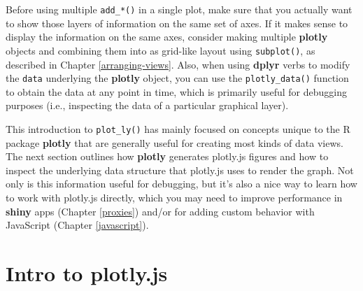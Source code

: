 \documentclass[
  12pt,
]{krantz}
\makeatletter
\newenvironment{Shaded}{\begin{snugshade}}{\end{snugshade}}
\newcommand{\CommentTok}[1]{\textcolor[rgb]{0.56,0.35,0.01}{\textit{#1}}}
\newcommand{\DataTypeTok}[1]{\textcolor[rgb]{0.13,0.29,0.53}{#1}}
\newcommand{\KeywordTok}[1]{\textcolor[rgb]{0.13,0.29,0.53}{\textbf{#1}}}
\newcommand{\NormalTok}[1]{#1}
\newcommand{\OperatorTok}[1]{\textcolor[rgb]{0.81,0.36,0.00}{\textbf{#1}}}
\newcommand{\StringTok}[1]{\textcolor[rgb]{0.31,0.60,0.02}{#1}}
\newcommand{\indexc}[1]{\index{#1@\texttt{#1}}}
\makeatother
\begin{document}
Before using multiple \texttt{add\_*()} in a single plot, make sure that you actually want to show those layers of information on the same set of axes. If it makes sense to display the information on the same axes, consider making multiple \textbf{plotly} objects and combining them into as grid-like layout using \texttt{subplot()}, as described in Chapter \ref{arranging-views}. Also, when using \textbf{dplyr} verbs to modify the \texttt{data} underlying the \textbf{plotly} object, you can use the \texttt{plotly\_data()} function to obtain the data at any point in time, which is primarily useful for debugging purposes (i.e., inspecting the data of a particular graphical layer).

\indexc{plotly\_data()}

\begin{Shaded}
\end{Shaded}

This introduction to \texttt{plot\_ly()} has mainly focused on concepts unique to the R package \textbf{plotly} that are generally useful for creating most kinds of data views. The next section outlines how \textbf{plotly} generates plotly.js figures and how to inspect the underlying data structure that plotly.js uses to render the graph. Not only is this information useful for debugging, but it's also a nice way to learn how to work with plotly.js directly, which you may need to improve performance in \textbf{shiny} apps (Chapter \ref{proxies}) and/or for adding custom behavior with JavaScript (Chapter \ref{javascript}).

\hypertarget{intro-plotly-js}{%
\section{Intro to plotly.js}\label{intro-plotly-js}}
\end{document}
